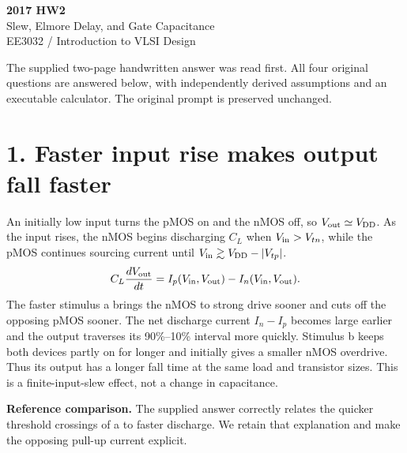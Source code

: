 \documentclass[11pt,a4paper]{article}
\newcommand{\VDD}{V_{\mathrm{DD}}}
\begin{document}
\begin{center}{\LARGE\bfseries 2017 HW2}\\[4pt]{\large Slew, Elmore Delay, and Gate Capacitance}\\[4pt]{\small EE3032 / Introduction to VLSI Design}\end{center}
The supplied two-page handwritten answer was read first. All four original questions are answered below, with independently derived assumptions and an executable calculator. The original prompt is preserved unchanged.
\section*{1. Faster input rise makes output fall faster}
An initially low input turns the pMOS on and the nMOS off, so $V_{\rm out}\simeq\VDD$. As the input rises, the nMOS begins discharging $C_L$ when $V_{\rm in}>V_{tn}$, while the pMOS continues sourcing current until $V_{\rm in}\gtrsim\VDD-|V_{tp}|$.
\[
 C_L\frac{dV_{\rm out}}{dt}=I_p(V_{\rm in},V_{\rm out})-I_n(V_{\rm in},V_{\rm out}).
\]
The faster stimulus a brings the nMOS to strong drive sooner and cuts off the opposing pMOS sooner. The net discharge current $I_n-I_p$ becomes large earlier and the output traverses its 90\%--10\% interval more quickly. Stimulus b keeps both devices partly on for longer and initially gives a smaller nMOS overdrive. Thus its output has a longer fall time at the same load and transistor sizes. This is a finite-input-slew effect, not a change in capacitance.
\begin{center}\end{center}
\textbf{Reference comparison.} The supplied answer correctly relates the quicker threshold crossings of a to faster discharge. We retain that explanation and make the opposing pull-up current explicit.
\end{document}
